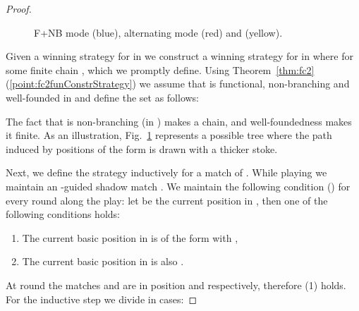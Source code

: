 \begin{proof}
\begin{figure}[h]
\centering
{}
\caption{F+NB mode (blue), alternating mode (red) and  (yellow).}
\label{fig:xp}
\end{figure}
 
\medskip
\noindent
\fbox{}
Given a winning strategy  for \eloise in  we construct a winning strategy  for \eloise in  where  for some finite chain , which we promptly define.
Using Theorem~\ref{thm:fc2}(\ref{point:fc2funConstrStrategy}) we assume that  is functional, non-branching and well-founded in  and define the set  as follows:

The fact that  is non-branching (in ) makes  a chain, and well-foundedness makes it finite. As an illustration, Fig.~\ref{fig:xp} represents a possible tree  where the path induced by positions of the form  is drawn with a thicker stoke.

Next, we define the strategy inductively for a match  of . While playing  we maintain an -guided shadow match . We maintain the following condition () for every round along the play: let  be the current position in , then one of the following conditions holds:
\begin{enumerate}[1.]
	\itemsep 0pt
	\item The current basic position in  is of the form  with ,
\item The current basic position in  is also . \end{enumerate}
At round  the matches  and  are in position  and  respectively, therefore (1) holds. For the inductive step we divide in cases:


\end{proof}
